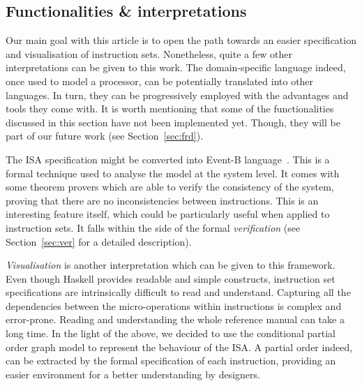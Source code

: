 \documentclass[conference]{IEEEtran}
\begin{document}
\subsection{Functionalities \& interpretations}
\label{sec:func}
Our main goal with this article is to open the path towards an easier specification and
visualisation of instruction sets. Nonetheless, quite a few other interpretations can be
given to this work. The domain-specific language indeed, once used to model
a processor, can be potentially translated into other languages. In turn, they
can be progressively employed with the advantages and tools they come with. It is worth
mentioning that some of the functionalities discussed in this section have not been
implemented yet. Though, they will be part of our future work (see Section~\ref{sec:frd}).

The ISA specification might be converted into Event-B language~\cite{eventB}. This is a
formal technique used to analyse the model at the system level. It comes with some theorem
provers which are able to verify the consistency of the system, proving that there are 
no inconsistencies between instructions. This is an interesting feature itself, which could
be particularly useful when applied to instruction sets. It falls within the side of the
formal \textit{verification} (see Section~\ref{sec:ver} for a detailed description).

\textit{Visualisation} is another interpretation which can be given to this framework.
Even though Haskell provides readable and simple constructs, instruction
set specifications are intrinsically difficult to read and understand.
Capturing all the dependencies between the micro-operations within instructions is
complex and error-prone. Reading and understanding the whole reference manual can take a long time.
In the light of the above, we decided to use the conditional partial order graph model to represent
the behaviour of the ISA. A partial order indeed, can be extracted by the formal specification
of each instruction, providing an easier environment for a better understanding by designers.
\end{document}
